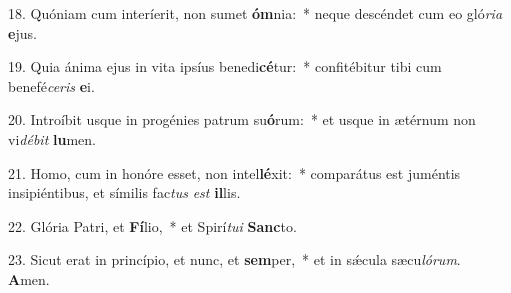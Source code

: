 18. Quóniam cum interíerit, non sumet \textbf{óm}nia:~*  neque descéndet cum eo gló\textit{ri}\textit{a} \textbf{e}jus.\

19. Quia ánima ejus in vita ipsíus benedi\textbf{cé}tur:~*  confitébitur tibi cum benefé\textit{ce}\textit{ris} \textbf{e}i.\

20. Introíbit usque in progénies patrum su\textbf{ó}rum:~*  et usque in ætérnum non vi\textit{dé}\textit{bit} \textbf{lu}men.\

21. Homo, cum in honóre esset, non intel\textbf{lé}xit:~*  comparátus est juméntis insipiéntibus, et símilis fac\textit{tus} \textit{est} \textbf{il}lis.\

22. Glória Patri, et \textbf{Fí}lio,~*  et Spirí\textit{tu}\textit{i} \textbf{Sanc}to.\

23. Sicut erat in princípio, et nunc, et \textbf{sem}per,~*  et in sǽcula sæcu\textit{ló}\textit{rum}. \textbf{A}men.\

